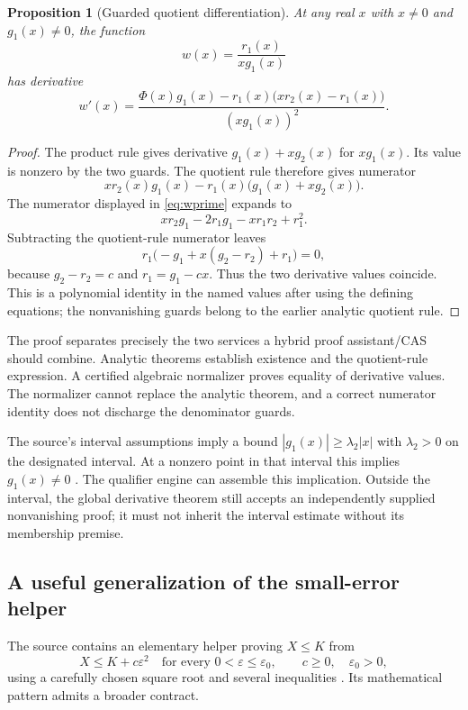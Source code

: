 \documentclass[11pt,a4paper]{article}
\newtheorem{proposition}[theorem]{Proposition}
\theoremstyle{definition}
\theoremstyle{remark}
\begin{document}
\begin{proposition}[Guarded quotient differentiation]
At any real $x$ with $x\ne0$ and $g_1(x)\ne0$, the function
\[
 w(x)=\frac{r_1(x)}{xg_1(x)}
\]
has derivative
\begin{equation}
 w'(x)=
 \frac{\Phi(x)g_1(x)-r_1(x)\bigl(xr_2(x)-r_1(x)\bigr)}
      {(xg_1(x))^2}.
\label{eq:wprime}
\end{equation}
\end{proposition}
\begin{proof}
The product rule gives derivative $g_1(x)+xg_2(x)$ for $xg_1(x)$. Its value is nonzero by the two guards. The quotient rule therefore gives numerator
\[
 xr_2(x)g_1(x)-r_1(x)\bigl(g_1(x)+xg_2(x)\bigr).
\]
The numerator displayed in \eqref{eq:wprime} expands to
\[
 xr_2g_1-2r_1g_1-xr_1r_2+r_1^2.
\]
Subtracting the quotient-rule numerator leaves
\[
 r_1\bigl(-g_1+x(g_2-r_2)+r_1\bigr)=0,
\]
because $g_2-r_2=c$ and $r_1=g_1-cx$. Thus the two derivative values coincide. This is a polynomial identity in the named values after using the defining equations; the nonvanishing guards belong to the earlier analytic quotient rule.
\end{proof}

The proof separates precisely the two services a hybrid proof assistant/CAS should combine. Analytic theorems establish existence and the quotient-rule expression. A certified algebraic normalizer proves equality of derivative values. The normalizer cannot replace the analytic theorem, and a correct numerator identity does not discharge the denominator guards.

The source's interval assumptions imply a bound $|g_1(x)|\ge\lambda_2|x|$ with $\lambda_2>0$ on the designated interval. At a nonzero point in that interval this implies $g_1(x)\ne0$ \cite{spTaylor,spParts}. The qualifier engine can assemble this implication. Outside the interval, the global derivative theorem still accepts an independently supplied nonvanishing proof; it must not inherit the interval estimate without its membership premise.

\subsection{A useful generalization of the small-error helper}
The source contains an elementary helper proving $X\le K$ from
\[
 X\le K+c\varepsilon^2
 \quad\text{for every }0<\varepsilon\le\varepsilon_0,
 \qquad c\ge0,\quad\varepsilon_0>0,
\]
using a carefully chosen square root and several inequalities \cite{spParts}. Its mathematical pattern admits a broader contract.
\end{document}
